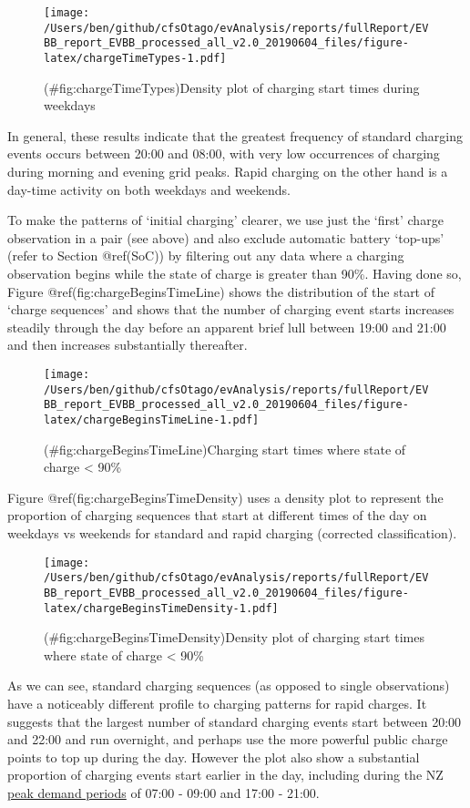 \documentclass[]{article}
\begin{document}
\begin{figure}
\centering
\texttt{[image: /Users/ben/github/cfsOtago/evAnalysis/reports/fullReport/EVBB\_report\_EVBB\_processed\_all\_v2.0\_20190604\_files/figure-latex/chargeTimeTypes-1.pdf]}
\caption{(\#fig:chargeTimeTypes)Density plot of charging start times during weekdays}
\end{figure}

In general, these results indicate that the greatest frequency of standard charging events occurs between 20:00 and 08:00, with very low occurrences of charging during morning and evening grid peaks. Rapid charging on the other hand is a day-time activity on both weekdays and weekends.

To make the patterns of `initial charging' clearer, we use just the `first' charge observation in a pair (see above) and also exclude automatic battery `top-ups' (refer to Section @ref(SoC)) by filtering out any data where a charging observation begins while the state of charge is greater than 90\%. Having done so, Figure @ref(fig:chargeBeginsTimeLine) shows the distribution of the start of `charge sequences' and shows that the number of charging event starts increases steadily through the day before an apparent brief lull between 19:00 and 21:00 and then increases substantially thereafter.

\begin{figure}
\centering
\texttt{[image: /Users/ben/github/cfsOtago/evAnalysis/reports/fullReport/EVBB\_report\_EVBB\_processed\_all\_v2.0\_20190604\_files/figure-latex/chargeBeginsTimeLine-1.pdf]}
\caption{(\#fig:chargeBeginsTimeLine)Charging start times where state of charge \textless{} 90\%}
\end{figure}

Figure @ref(fig:chargeBeginsTimeDensity) uses a density plot to represent the proportion of charging sequences that start at different times of the day on weekdays vs weekends for standard and rapid charging (corrected classification).

\begin{figure}
\centering
\texttt{[image: /Users/ben/github/cfsOtago/evAnalysis/reports/fullReport/EVBB\_report\_EVBB\_processed\_all\_v2.0\_20190604\_files/figure-latex/chargeBeginsTimeDensity-1.pdf]}
\caption{(\#fig:chargeBeginsTimeDensity)Density plot of charging start times where state of charge \textless{} 90\%}
\end{figure}

As we can see, standard charging sequences (as opposed to single observations) have a noticeably different profile to charging patterns for rapid charges. It suggests that the largest number of standard charging events start between 20:00 and 22:00 and run overnight, and perhaps use the more powerful public charge points to top up during the day. However the plot also show a substantial proportion of charging events start earlier in the day, including during the NZ \href{https://www.electrickiwi.co.nz/hour-of-power}{peak demand periods} of 07:00 - 09:00 and 17:00 - 21:00.
\end{document}
